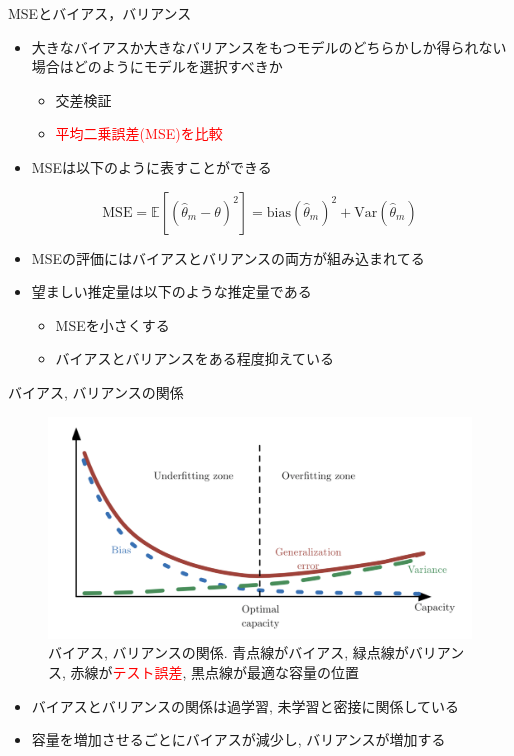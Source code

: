 \documentclass[dvipdfmx, 10pt]{beamer}
\newcommand{\red}[1]{\textcolor{red}{#1}}
\newcommand{\green}[1]{\textcolor{green!40!black}{#1}}
\newcommand{\blue}[1]{\textcolor{blue!80!black}{#1}}
\begin{document}
\begin{frame}{MSEとバイアス，バリアンス}
  \begin{itemize}
    \item 大きなバイアスか大きなバリアンスをもつモデルのどちらかしか得られない場合はどのようにモデルを選択すべきか
    \begin{itemize}
      \item 交差検証
      \item \textcolor{red}{平均二乗誤差(MSE)を比較}
    \end{itemize}
    \item MSEは以下のように表すことができる
  \end{itemize}
  \begin{equation}
    \mathrm{MSE} = \mathbb{E}[(\hat{\theta}_{m} - \theta)^{2}] = \mathrm{bias}(\hat{\theta}_{m})^{2} + \mathrm{Var}(\hat{\theta}_{m})
  \end{equation}
  \begin{itemize}
    \item MSEの評価にはバイアスとバリアンスの両方が組み込まれてる
    \item 望ましい推定量は以下のような推定量である
    \begin{itemize}
      \item MSEを小さくする
      \item バイアスとバリアンスをある程度抑えている
    \end{itemize}
  \end{itemize}
\end{frame}


\begin{frame}{バイアス, バリアンスの関係}
  \begin{figure}[htbp]
    \includegraphics[width=0.8\linewidth]{./images/bias-variance.png}
    \caption{バイアス, バリアンスの関係. 青点線が\blue{バイアス}, 緑点線が\green{バリアンス}, 赤線が\red{テスト誤差}, 黒点線が最適な容量の位置}
  \end{figure}
  \begin{itemize}
    \item バイアスとバリアンスの関係は過学習, 未学習と密接に関係している
    \item 容量を増加させるごとにバイアスが減少し, バリアンスが増加する
  \end{itemize}
\end{frame}
\end{document}
